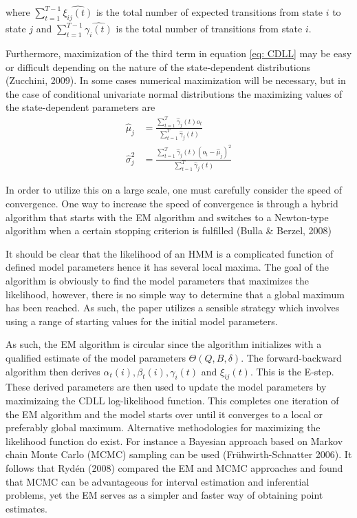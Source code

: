 where $\sum_{t=1}^{T-1}\hat{\xi_{ij}(t)}$ is the total number of expected transitions from state $i$ to state $j$ and $\sum_{t=1}^{T-1}\hat{\gamma_i(t)}$ is the total number of transitions from state $i$.

Furthermore, maximization of the third term in equation \ref{eq: CDLL} may be easy or difficult depending on the nature of the state-dependent distributions (Zucchini, 2009). In some cases numerical maximization will be necessary, but in the case of conditional univariate normal
distributions the maximizing values of the state-dependent parameters are
\begin{align}
    \hat\mu_j &= \frac{\sum_{t=1}^T\hat\gamma_j(t)o_t}{\sum_{t=1}^T \hat\gamma_j(t)} \\
    \hat\sigma_j^2 &= \frac{\sum_{t=1}^T\hat\gamma_j(t)(o_t-\hat\mu_j)^2}{\sum_{t=1}^T \hat\gamma_j(t)}
\end{align}

In order to utilize this on a large scale, one must carefully consider the speed of convergence. One way to increase the speed of convergence is through a hybrid algorithm that starts with the EM algorithm and switches to a Newton-type algorithm when a certain stopping criterion is fulfilled (Bulla \& Berzel, 2008)

It should be clear that the likelihood of an HMM is a complicated function of defined model parameters hence it has several local maxima. The goal of the algorithm is obviously to find the model parameters that maximizes the likelihood, however, there is no simple way to determine that a global maximum has been reached. As such, the paper utilizes a sensible strategy which involves using a range of starting values for the initial model parameters.

As such, the EM algorithm is circular since the algorithm initializes with a qualified estimate of the model parameters $\Theta(Q, B,\delta)$. The forward-backward algorithm then derives $\alpha_t(i), \beta_t(i), \gamma_i(t)$ and $\xi_{ij}(t)$. This is the E-step. These derived parameters are then used to update the model parameters by maximizaing the CDLL log-likelihood function. This completes one iteration of the EM algorithm and the model starts over until it converges to a local or preferably global maximum. Alternative methodologies for maximizing the likelihood function do exist. For instance a Bayesian approach based on Markov chain Monte Carlo (MCMC) sampling can be used (Frühwirth-Schnatter 2006). It follows that Rydén (2008) compared the EM and MCMC approaches and found that MCMC can be advantageous for interval estimation and inferential problems, yet the EM serves as a simpler and faster way of obtaining point estimates.

